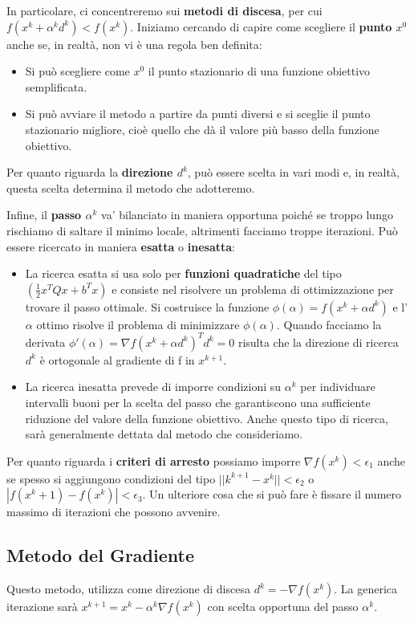 In particolare, ci concentreremo sui \textbf{metodi di discesa}, per cui $f(x^k+\alpha^k d^k) < f(x^k)$.
Iniziamo cercando di capire come scegliere il \textbf{punto $x^0$} anche se, in realtà, non vi è una regola ben definita:
\begin{itemize}
    \item Si può scegliere come $x^0$ il punto stazionario di una funzione obiettivo semplificata.
    \item Si può avviare il metodo a partire da punti diversi e si sceglie il punto stazionario migliore, cioè quello che dà il valore più basso della funzione obiettivo. 
\end{itemize}

Per quanto riguarda la \textbf{direzione $d^k$}, può essere scelta in vari modi e, in realtà, questa scelta determina il metodo che adotteremo.

Infine, il \textbf{passo $\alpha^k$} va' bilanciato in maniera opportuna poiché se troppo lungo rischiamo di saltare il minimo locale, altrimenti facciamo troppe iterazioni.  Può essere ricercato in maniera \textbf{esatta} o \textbf{inesatta}:
\begin{itemize}
    \item La ricerca esatta si usa solo per \textbf{funzioni quadratiche} del tipo $(\frac{1}{2} x^T Qx + b^Tx)$ e consiste nel risolvere un problema di ottimizzazione per trovare il passo ottimale. Si costruisce la funzione $\phi (\alpha) = f(x^k + \alpha d^k)$ e l'$\alpha$ ottimo risolve il problema di minimizzare $\phi(\alpha)$. Quando facciamo la derivata $\phi'(\alpha) = \nabla f(x^k + \alpha d^k)^T d^k = 0$ risulta che la direzione di ricerca $d^k$ è ortogonale al gradiente di f in $x^{k+1}$.
    \item La ricerca inesatta prevede di imporre condizioni su $\alpha^k$ per individuare intervalli  buoni per la scelta del passo che garantiscono una sufficiente riduzione del valore della funzione obiettivo. Anche questo tipo di ricerca, sarà generalmente dettata dal metodo che consideriamo.
\end{itemize}

Per quanto riguarda i \textbf{criteri di arresto} possiamo imporre $\nabla f(x^k) < \epsilon_1$ anche se spesso si aggiungono condizioni del tipo $|| k^{k+1}- x^k||< \epsilon_2$ o $|f(x^k+1) -f(x^k)| < \epsilon_3$. Un ulteriore cosa che si può fare è fissare il numero massimo di iterazioni che possono avvenire.

\subsection{Metodo del Gradiente}
Questo metodo, utilizza come direzione di discesa $d^k=-\nabla f(x^k)$. La generica iterazione sarà $x^{k+1} = x^{k} - \alpha^k \nabla f(x^k)$ con scelta opportuna del passo $\alpha^k$. 

